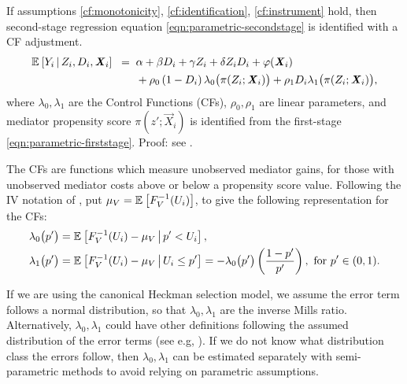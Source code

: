 \begin{proposition}
    \label{proposition:secondstage}
    If assumptions \ref{cf:monotonicity}, \ref{cf:identification}, \ref{cf:instrument} hold, then second-stage regression equation \eqref{eqn:parametric-secondstage} is identified with a CF adjustment.
    \begin{align*}
        \mathbb{E}_{} \left[ Y_i \, \middle\vert \, Z_i, D_i, \boldsymbol{\mathit{X}}_i \right] \;\; =& \;\;
            \alpha
            + \beta D_i
            + \gamma Z_i
            + \delta Z_i D_i
            + \varphi(\boldsymbol{\mathit{X}}_i) \\
            & \;\; +  \rho_0 \left( 1 - D_i \right) \lambda_0 \big( \pi(Z_i ; \boldsymbol{\mathit{X}}_i) \big)
                + \rho_1 D_i \lambda_1 \big( \pi(Z_i ; \boldsymbol{\mathit{X}}_i) \big),
            \label{eqn:cf-secondstage}
    \end{align*}
    where $\lambda_0, \lambda_1$ are the Control Functions (CFs), $\rho_0, \rho_1$ are linear parameters, and mediator propensity score $\pi(z';\vec X_i)$ is identified from the first-stage \eqref{eqn:parametric-firststage}.
    Proof: see .
\end{proposition}
The CFs are functions which measure unobserved mediator gains, for those with unobserved mediator costs above or below a propensity score value.
Following the IV notation of \cite{kline2019heckits}, put $\mu_V = \mathbb{E}_{} \left[ F^{-1}_V(U_i) \right]$, to give the following representation for the CFs:
\begin{align*}
    \lambda_0\big(p'\big) &=
        \mathbb{E}_{} \left[  F^{-1}_V(U_i) - \mu_V \, \middle\vert \, p' < U_i \right], \\
    \lambda_1\big(p'\big) &=
        \mathbb{E}_{} \left[  F^{-1}_V(U_i) - \mu_V \, \middle\vert \, U_i \leq p' \right] = 
            -\lambda_0\big( p' \big) \left(\frac{1-p'}{p'}\right), \text{ for } p' \in (0,1).
\end{align*}

If we are using the canonical Heckman selection model, we assume the error term follows a normal distribution, so that $\lambda_0, \lambda_1$ are the inverse Mills ratio.
Alternatively, $\lambda_0, \lambda_1$ could have other definitions following the assumed distribution of the error terms (see e.g, \citealt{wooldridge2015control}).
If we do not know what distribution class the errors follow, then $\lambda_0, \lambda_1$ can be estimated separately with semi-parametric methods to avoid relying on parametric assumptions.

